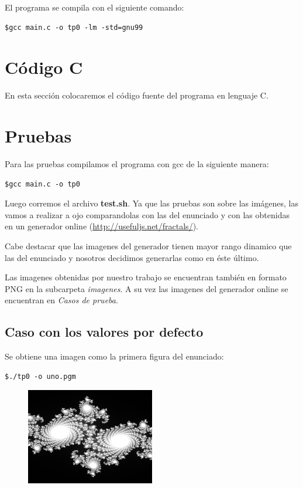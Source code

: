 \documentclass[a4paper,10pt]{article}
\begin{document}
El programa se compila con el siguiente comando:
\begin{lstlisting}[frame=single]
$gcc main.c -o tp0 -lm -std=gnu99
\end{lstlisting}

\section{C\'{o}digo C}

En esta secci\'{o}n colocaremos el c\'{o}digo fuente del programa en lenguaje C.



\newpage

\section{Pruebas}

Para las pruebas compilamos el programa con gcc de la siguiente manera:

\begin{lstlisting}[frame=single]
$gcc main.c -o tp0
\end{lstlisting}
Luego corremos el archivo \textbf{test.sh}.
Ya que las pruebas son sobre las im\'{a}genes, las vamos a realizar a ojo comparandolas con las del enunciado y con las obtenidas en un generador online (\url{http://usefuljs.net/fractals/}).

Cabe destacar que las imagenes del generador tienen mayor rango dinamico que las del enunciado y nosotros decidimos generarlas como en \'{e}ste \'{u}ltimo.

Las imagenes obtenidas por nuestro trabajo se encuentran tambi\'{e}n en formato PNG en la subcarpeta \textit{imagenes}.
A su vez las imagenes del generador online se encuentran en \textit{Casos de prueba}.

\subsection{Caso con los valores por defecto}
Se obtiene una imagen como la primera figura del enunciado:

\begin{lstlisting}[frame=single]
$./tp0 -o uno.pgm
\end{lstlisting}

\begin{figure}[H]
\begin{center}
\includegraphics[width=0.5\textwidth]{imagenes/uno.png}
\caption{} \label{uno}
\end{center}
\end{figure}
\end{document}
